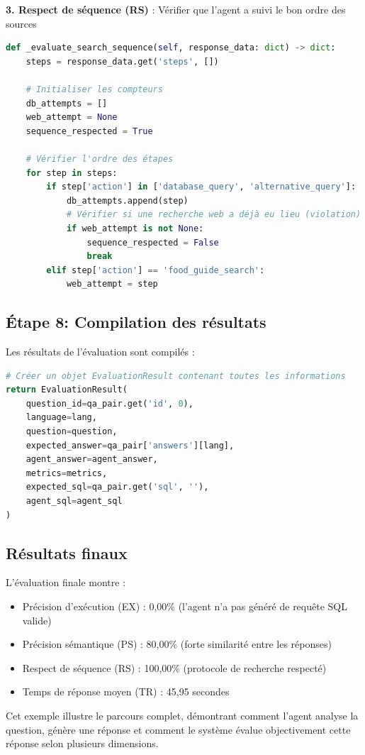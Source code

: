 \documentclass[a4paper,11pt]{article}
\begin{document}
\textbf{3. Respect de séquence (RS)} : Vérifier que l'agent a suivi le bon ordre des sources

\begin{lstlisting}[language=Python, caption=Évaluation du respect de séquence]
def _evaluate_search_sequence(self, response_data: dict) -> dict:
    steps = response_data.get('steps', [])
    
    # Initialiser les compteurs
    db_attempts = []
    web_attempt = None
    sequence_respected = True
    
    # Vérifier l'ordre des étapes
    for step in steps:
        if step['action'] in ['database_query', 'alternative_query']:
            db_attempts.append(step)
            # Vérifier si une recherche web a déjà eu lieu (violation)
            if web_attempt is not None:
                sequence_respected = False
                break
        elif step['action'] == 'food_guide_search':
            web_attempt = step
\end{lstlisting}

\newpage
\subsection*{Étape 8: Compilation des résultats}

Les résultats de l'évaluation sont compilés :

\begin{lstlisting}[language=Python, caption=Compilation des résultats]
# Créer un objet EvaluationResult contenant toutes les informations
return EvaluationResult(
    question_id=qa_pair.get('id', 0),
    language=lang,
    question=question,
    expected_answer=qa_pair['answers'][lang],
    agent_answer=agent_answer,
    metrics=metrics,
    expected_sql=qa_pair.get('sql', ''),
    agent_sql=agent_sql
)
\end{lstlisting}

\subsection*{Résultats finaux}

L'évaluation finale montre :

\begin{itemize}
  \item Précision d'exécution (EX) : 0,00\% (l'agent n'a pas généré de requête SQL valide)
  \item Précision sémantique (PS) : 80,00\% (forte similarité entre les réponses)
  \item Respect de séquence (RS) : 100,00\% (protocole de recherche respecté)
  \item Temps de réponse moyen (TR) : 45,95 secondes
\end{itemize}

Cet exemple illustre le parcours complet, démontrant comment l'agent analyse la question, génère une réponse et comment le système
évalue objectivement cette réponse selon plusieurs dimensions.

\end{document}
